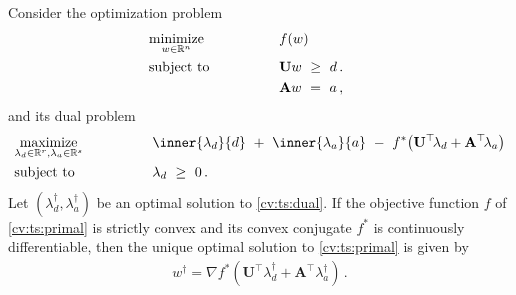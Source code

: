 \begin{ftheorem}
  \label{cv:ts:th}
  Consider the optimization problem
\begin{align}
  \label{cv:ts:primal}
    &\underset{w \in \R^n}
    {\mathrm{minimize}}
    &&\qquad\qquad
    f(w)
    &&&
    \\
    \nonumber
    &\mathrm{subject}\ \mathrm{to} 
    &&\qquad\qquad
    \mathbf{U}w
    \ 
    \ge
    \ 
    d
    \,.
    \\
    \nonumber
    &
    &&\qquad\qquad
    \mathbf{A}w
    \ 
    =
    \ 
    a
    \,,
\end{align}
and its dual problem
  \begin{alignat}{2}
    \label{cv:ts:dual}
    &\underset{
    \lambda_d \in \R^r
,
    \lambda_a \in \R^s
  }
    {\mathrm{maximize}}
    &&\qquad\qquad
    \inner
    {\lambda_d}
    {d}
    \ 
    +
    \ 
    \inner
    {\lambda_a}
    {a}
    \ 
    -
    \ 
    f^*
    \!
    \left( 
      \mathbf{U}^\top \! \lambda_d
      +
      \mathbf{A}^\top \! \lambda_a
    \right)
    \\
    \nonumber
    &\mathrm{subject}\ \mathrm{to} 
    &&\qquad\qquad
    \lambda_d
    \ 
    \ge
    \ 
    0
    \,.
\end{alignat}
  Let 
$
(\lambda_d^\dagger,\lambda_a^\dagger)
$
be an optimal solution to \eqref{cv:ts:dual}.
If the objective function $f$ of 
\eqref{cv:ts:primal} is strictly convex and its
convex conjugate $f^*$ is continuously differentiable,
then the unique optimal solution to 
\eqref{cv:ts:primal}
is given by
\begin{gather}
  w^\dagger
  =
  \nabla
    f^*
    \!
    \left( 
      \mathbf{U}^\top  \lambda_d^\dagger
      +
      \mathbf{A}^\top  \lambda_a^\dagger
    \right)
    \,.
\end{gather}
\end{ftheorem}

